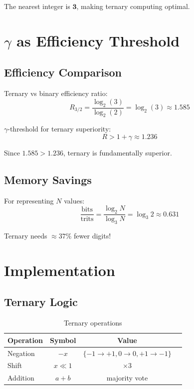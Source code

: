 \documentclass[12pt,a4paper]{article}
\begin{document}
The nearest integer is $\mathbf{3}$, making ternary computing optimal.

\section{$\gamma$ as Efficiency Threshold}

\subsection{Efficiency Comparison}

Ternary vs binary efficiency ratio:
\begin{equation}
R_{3/2} = \frac{\log_2(3)}{\log_2(2)} = \log_2(3) \approx 1.585
\end{equation}

$\gamma$-threshold for ternary superiority:
\begin{equation}
R > 1 + \gamma \approx 1.236
\end{equation}

Since $1.585 > 1.236$, ternary is fundamentally superior.

\subsection{Memory Savings}

For representing $N$ values:
\begin{equation}
\frac{\text{bits}}{\text{trits}} = \frac{\log_2 N}{\log_3 N} = \log_3 2 \approx 0.631
\end{equation}

Ternary needs $\approx 37\%$ fewer digits!

\section{Implementation}

\subsection{Ternary Logic}

\begin{table}[h]
\centering
\begin{tabular}{lccc}
\toprule
Operation & Symbol & Value \\
\midrule
Negation & $-x$ & $\{-1 \to +1, 0 \to 0, +1 \to -1\}$ \\
Shift & $x \ll 1$ & $\times 3$ \\
Addition & $a + b$ & majority vote \\
\bottomrule
\end{tabular}
\caption{Ternary operations}
\end{table}
\end{document}
